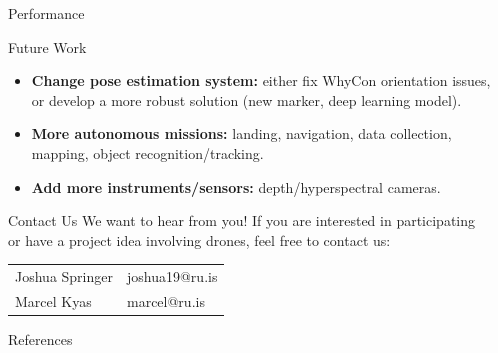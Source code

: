 \documentclass[final, 20pt]{beamer}
\newlength{\sepwidth}
\newlength{\colwidth}
\newcommand{\separatorcolumn}{\begin{column}{\sepwidth}\end{column}}
\begin{document}
\begin{frame}[t]
\begin{columns}[t]
\begin{column}{\colwidth}
\begin{alertblock}{Performance}

  \end{alertblock}

  \begin{block}{Future Work}

    \begin{itemize}
      \item \textbf{Change pose estimation system:} either fix WhyCon orientation issues, or develop a more robust solution (new marker, deep learning model).
      \item \textbf{More autonomous missions:} landing, navigation, data collection, mapping, object recognition/tracking.
      \item \textbf{Add more instruments/sensors:} depth/hyperspectral cameras.
    \end{itemize}

  \end{block}

  \begin{alertblock}{Contact Us}
    We want to hear from you!
    If you are interested in participating or have a project idea involving drones, feel free to contact us:

    \begin{center}
    \begin{tabular}{|ll|}
        \hline
        Joshua Springer & joshua19@ru.is\\%
        Marcel Kyas & marcel@ru.is\\\hline
    \end{tabular}
    \end{center}
  \end{alertblock}

  \begin{block}{References}
    \vspace{-0.5cm}
    
    \footnotesize{}

  \end{block}

\end{column}

\separatorcolumn
\end{columns}
\end{frame}
\end{document}
